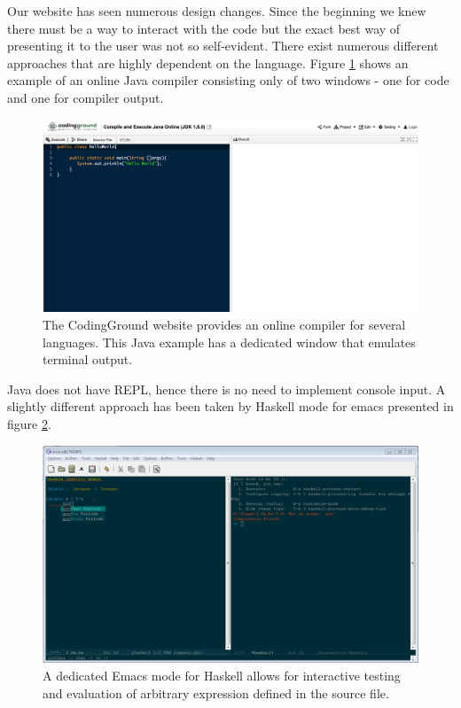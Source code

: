 Our website has seen numerous design changes. Since the beginning we knew there must be a way to interact with the code but the exact best way of presenting it to the user was not so self-evident. There exist numerous different approaches that are highly dependent on the language. Figure \ref{java_console} shows an example of an online  Java  compiler consisting only of two windows - one for code and one for compiler output.
\begin{figure}
	\includegraphics[scale=0.3]{java.png}
	\caption{The CodingGround website provides an online compiler for several languages. This Java example has a dedicated window that emulates terminal output.}
	\label{java_console}
\end{figure}
Java does not have REPL, hence there is no need to implement console input.
A slightly different approach has been taken by Haskell mode for emacs presented in figure \ref{haskell_repl}. 
\begin{figure}
	\centering
	\includegraphics[scale=0.45]{haskell.png}
	\caption{A dedicated Emacs mode for Haskell allows for interactive testing and evaluation of arbitrary expression defined in the source file.}
	\label{haskell_repl}
\end{figure}
